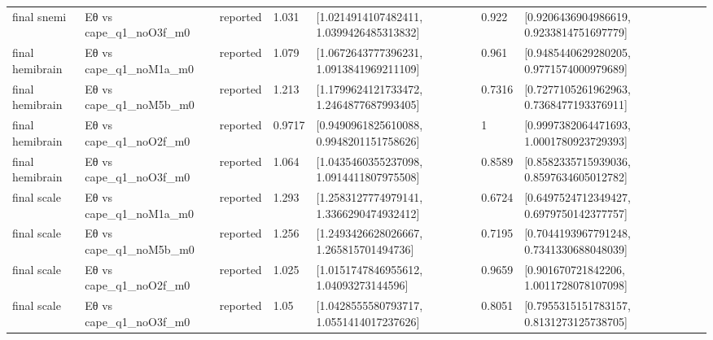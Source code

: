 \begin{table}[t]
\begin{tabular}{lllllllll}
final snemi & Eθ vs cape\_q1\_noO3f\_m0 & reported & 1.031 & [1.0214914107482411, 1.0399426485313832] & 0.922 & [0.9206436904986619, 0.9233814751697779] &  &  \\
final hemibrain & Eθ vs cape\_q1\_noM1a\_m0 & reported & 1.079 & [1.0672643777396231, 1.0913841969211109] & 0.961 & [0.9485440629280205, 0.9771574000979689] &  &  \\
final hemibrain & Eθ vs cape\_q1\_noM5b\_m0 & reported & 1.213 & [1.1799624121733472, 1.2464877687993405] & 0.7316 & [0.7277105261962963, 0.7368477193376911] &  &  \\
final hemibrain & Eθ vs cape\_q1\_noO2f\_m0 & reported & 0.9717 & [0.9490961825610088, 0.9948201151758626] & 1 & [0.9997382064471693, 1.0001780923729393] &  &  \\
final hemibrain & Eθ vs cape\_q1\_noO3f\_m0 & reported & 1.064 & [1.0435460355237098, 1.0914411807975508] & 0.8589 & [0.8582335715939036, 0.8597634605012782] &  &  \\
final scale & Eθ vs cape\_q1\_noM1a\_m0 & reported & 1.293 & [1.2583127774979141, 1.3366290474932412] & 0.6724 & [0.6497524712349427, 0.6979750142377757] &  &  \\
final scale & Eθ vs cape\_q1\_noM5b\_m0 & reported & 1.256 & [1.2493426628026667, 1.265815701494736] & 0.7195 & [0.7044193967791248, 0.7341330688048039] &  &  \\
final scale & Eθ vs cape\_q1\_noO2f\_m0 & reported & 1.025 & [1.0151747846955612, 1.04093273144596] & 0.9659 & [0.901670721842206, 1.0011728078107098] &  &  \\
final scale & Eθ vs cape\_q1\_noO3f\_m0 & reported & 1.05 & [1.0428555580793717, 1.0551414017237626] & 0.8051 & [0.7955315151783157, 0.8131273125738705] &  &  \\
\hline
\end{tabular}
\end{table}
